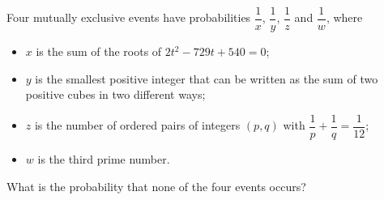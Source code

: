 Four mutually exclusive events have probabilities $\dfrac1x$, $\dfrac1y$, $\dfrac1z$ and $\dfrac1w$, where
\begin{itemize}
\item $x$ is the sum of the roots of $2t^2-729t+540=0$;
\item $y$ is the smallest positive integer that can be written as the sum of two positive cubes in two different ways;
\item $z$ is the number of ordered pairs of integers $(p,q)$ with $\dfrac1p+\dfrac1q=\dfrac1{12}$;
\item $w$ is the third prime number.
\end{itemize}
What is the probability that none of the four events occurs?
